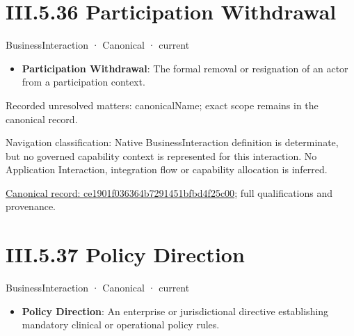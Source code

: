 \section*{III.5.36 Participation Withdrawal}
\label{navigation:III.5.36}

\label{element:ce1901f036364b7291451bfbd4f25c00}
{\small BusinessInteraction · Canonical · current}\par

\begin{itemize}


\item \textbf{Participation Withdrawal}: The formal removal or resignation of an actor from a participation context.

\end{itemize}

{\small Recorded unresolved matters: canonicalName; exact scope remains in the canonical record.}\par
{\small Navigation classification: Native BusinessInteraction definition is determinate, but no governed capability context is represented for this interaction. No Application Interaction, integration flow or capability allocation is inferred.}\par
{\footnotesize \href{../../../../../../../continuum/business/business-interaction/ce1901f036364b7291451bfbd4f25c00.md}{Canonical record: ce1901f036364b7291451bfbd4f25c00}; full qualifications and provenance.}\par
\section*{III.5.37 Policy Direction}
\label{navigation:III.5.37}

\label{element:b2c573b855ad4c7abc4f02b2ae484a65}
{\small BusinessInteraction · Canonical · current}\par

\begin{itemize}


\item \textbf{Policy Direction}: An enterprise or jurisdictional directive establishing mandatory clinical or operational policy rules.

\end{itemize}

